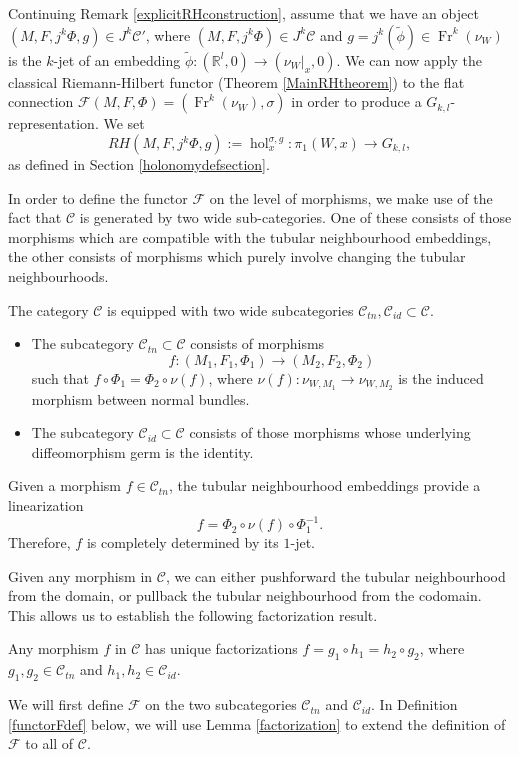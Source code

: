 \documentclass[10pt]{amsart}
\newcommand{\F}{{\mathcal{F}}}
\newcommand{\RR}{\mathbb{R}}
\newcommand{\hol}{{\operatorname{hol}}}
\newcommand{\Fr}{{\operatorname{Fr}}}
\numberwithin{theoremalpha}{section}
\numberwithin{equation}{section}
\numberwithin{definition}{section}
\numberwithin{theorem}{section}
\numberwithin{proposition}{section}
\numberwithin{lemma}{section}
\numberwithin{example}{section}
\numberwithin{remark}{section}
\numberwithin{corollary}{section}
\numberwithin{question}{section}
\numberwithin{problem}{section}
\numberwithin{assumption}{section}
\theoremstyle{named}
\numberwithin{equation}{section}
\begin{document}
\begin{remark}
Continuing Remark \ref{explicitRHconstruction}, assume that we have an object $(M, F, j^k \Phi, g) \in J^k\mathcal{C}'$, where $(M, F, j^{k} \Phi) \in J^k \mathcal{C}$ and $g = j^{k}(\tilde{\phi}) \in \Fr^{k}(\nu_{W})$ is the $k$-jet of an embedding $\tilde{\phi}: (\RR^l, 0) \to (\nu_{W}|_{x}, 0)$. We can now apply the classical Riemann-Hilbert functor (Theorem \ref{MainRHtheorem}) to the flat connection $ \F(M, F, \Phi) = (\Fr^{k}(\nu_{W}), \sigma)$ in order to produce a $G_{k,l}$-representation. We set
\[ RH(M, F, j^k\Phi, g) := \hol_{x}^{\sigma, g} : \pi_{1}(W,x) \to G_{k,l}, \]
as defined in Section \ref{holonomydefsection}.
\end{remark}

In order to define the functor $\F$ on the level of morphisms, we make use of the fact that $\mathcal{C}$ is generated by two wide sub-categories. One of these consists of those morphisms which are compatible with the tubular neighbourhood embeddings, the other consists of morphisms which purely involve changing the tubular neighbourhoods. 
\begin{definition}
The category $\mathcal{C}$ is equipped with two wide subcategories $\mathcal{C}_{tn}, \mathcal{C}_{id} \subset \mathcal{C}$. 
\begin{itemize}
\item The subcategory $\mathcal{C}_{tn} \subset \mathcal{C}$ consists of morphisms
\[ f: (M_{1}, F_{1}, \Phi_{1}) \to (M_{2}, F_{2}, \Phi_{2}) \]
such that $f \circ \Phi_{1} = \Phi_{2} \circ \nu(f)$, where $\nu(f) : \nu_{W, M_{1}} \to \nu_{W, M_{2}}$ is the induced morphism between normal bundles.
\item The subcategory $\mathcal{C}_{id} \subset \mathcal{C}$ consists of those morphisms whose underlying diffeomorphism germ is the identity. \qedhere
\end{itemize}
\end{definition}
\begin{remark}
Given a morphism $f \in \mathcal{C}_{tn}$, the tubular neighbourhood embeddings provide a linearization 
\[
 f = \Phi_2 \circ \nu(f) \circ \Phi_{1}^{-1}. 
\]
Therefore, $f$ is completely determined by its $1$-jet. 
\end{remark}

Given any morphism in $\mathcal{C}$, we can either pushforward the tubular neighbourhood from the domain, or pullback the tubular neighbourhood from the codomain. This allows us to establish the following factorization result.  
\begin{lemma} \label{factorization}
Any morphism $f$ in $\mathcal{C}$ has unique factorizations $f = g_{1} \circ h_{1} = h_{2} \circ g_{2}$, where $g_{1}, g_{2} \in \mathcal{C}_{tn}$ and $h_{1}, h_{2} \in \mathcal{C}_{id}$. 
\end{lemma}
We will first define $\F$ on the two subcategories $\mathcal{C}_{tn}$ and $\mathcal{C}_{id}$. In Definition \ref{functorFdef} below, we will use Lemma \ref{factorization} to extend the definition of $\F$ to all of $\mathcal{C}$.
\end{document}
